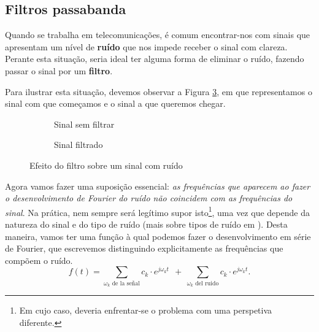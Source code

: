\subsection{Filtros passabanda}
Quando se trabalha em telecomunicações, é comum encontrar-nos com sinais que apresentam um nível de \textbf{ruído} que nos impede receber o sinal com clareza. Perante esta situação, seria ideal ter alguma forma de eliminar o ruído, fazendo passar o sinal por um \textbf{filtro}.

Para ilustrar esta situação, devemos observar a Figura \ref{fig:EfectoFiltro}, em que representamos o sinal com que começamos e o sinal a que queremos chegar.


\begin{figure}[h]
\begin{figurebox}
    \vspace{10pt}
    \centering
      \begin{subfigure}{.45\textwidth}
          \centering
          \scalebox{0.30}{ }
          \caption{Sinal sem filtrar}
          \label{fig:0a} 
      \end{subfigure}%
      \begin{subfigure}{.45\textwidth}
          \centering
          \scalebox{0.30}{}
          \caption{Sinal filtrado}
          \label{fig:0b}
      \end{subfigure}
      \caption{Efeito do filtro sobre um sinal com ruído}
      \label{fig:EfectoFiltro}
    
\end{figurebox}
\end{figure}

Agora vamos fazer uma suposição essencial: \textit{as frequências que aparecem ao fazer o desenvolvimento de Fourier do ruído não coincidem com as frequências do sinal}. Na prática, nem sempre será legítimo supor isto\footnote{ Em cujo caso, deveria enfrentar-se o problema com uma perspetiva diferente.}, uma vez que depende da natureza do sinal e do tipo de ruído (mais sobre tipos de ruído em \cite{ColorNoise}). Desta maneira, vamos ter uma função à qual podemos fazer o desenvolvimento em série de Fourier, que escrevemos distinguindo explicitamente as frequências que compõem o ruído.
\begin{equation}
  \label{eq:FourierSignalRuido1}
  f(t) = \sum_{\omega_k\text{ de la señal}}\!\!\!\!\!\!\!c_k \cdot e^{j\omega_k t}\ \ +\  \sum_{\omega_k\text{ del ruido}}\!\!\!\!\!c_k \cdot e^{j\omega_k t}.
\end{equation}

